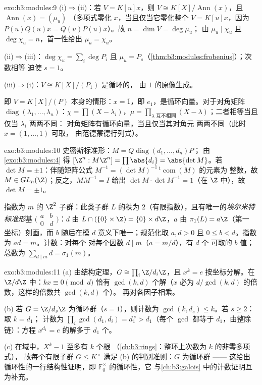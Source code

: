 \begin{solution}{exo:b3:modules:9}
(i)$\Rightarrow$(ii)：若 $V = K[u]x$，则 $V \cong
K[X]/\operatorname{Ann}(x)$，且 $\operatorname{Ann}(x) = (\mu_u)$
（多项式零化 $x$，当且仅当它零化整个 $V = K[u]x$，因为
$P(u)Q(u)x = Q(u)P(u)x$）。故 $n = \dim V = \deg \mu_u$；
由 $\mu_u \mid \chi_u$ 且 $\deg\chi_u = n$，首一性给出 $\mu_u =
\chi_u$。

(ii)$\Rightarrow$(iii)：$\deg\chi_u = \sum_i \deg P_i$ 且
$\mu_u = P_s$（\cref{thm:b3:modules:frobenius}）；次数相等
迫使 $s = 1$。

(iii)$\Rightarrow$(i)：$V \cong K[X]/(P_1)$ 是循环的，
由 $\bar 1$ 的原像生成。

即 $V = K[X]/(P)$ 本身的情形：$x = \bar
1$，即 $e_1$，是循环向量。对于对角矩阵
$\operatorname{diag}(\lambda_1, \dots, \lambda_n)$：$\chi = \prod
(X - \lambda_i)$，$\mu = \prod_{\lambda \text{ 互不相同}} (X -
\lambda)$；二者相等当且仅当 $\lambda_i$ 两两不同：
对角矩阵有循环向量，当且仅当其对角元
两两不同（此时 $x = (1, \dots, 1)$ 可取，
由范德蒙德行列式）。
\end{solution}

\begin{solution}{exo:b3:modules:10}
史密斯标准形：$M = Q\operatorname{diag}(d_1,\dots,d_n)P$；
由\cref{exo:b3:modules:4} 得 $[\Z^n : M\Z^n] = \prod\abs{d_i} =
\abs{\det M}$。若 $\det M = \pm 1$：伴随矩阵公式
$M^{-1} = (\det M)^{-1}\,{}^{t}\!\operatorname{com}(M)$ 的元素为
整数，故 $M \in GL_n(\Z)$；反之，$MM^{-1} = I$
给出 $\det M \cdot \det M^{-1} = 1$（在 $\Z$ 中），故 $\det M = \pm1$。

指数为 $m$ 的 $\Z^2$ 子群：此类子群 $L$ 的秩为
$2$（有限指数），且有唯一的\emph{埃尔米特
标准形}基 $\bigl(\begin{smallmatrix} a & b\\ 0 &
d\end{smallmatrix}\bigr)$：$d$ 由 $L \cap (\{0\}
\times \Z) = \{0\} \times d\Z$，$a$ 由 $\pi_1(L) = a\Z$（第一
坐标）刻画，而 $b$ 随后在模 $d$ 意义下唯一；规范化取 $a, d
> 0$ 且 $0 \leq b < d$。指数为 $ad = m$。计数：对每个
对每个因数 $d \mid m$（$a = m/d$），有 $d$ 个
可取的 $b$ 值；总数为 $\sum_{d \mid m} d = \sigma_1(m)$。
\end{solution}

\begin{solution}{exo:b3:modules:11}
(a) 由结构定理，$G \cong \prod_i\Z/d_i\Z$，且
$x^k = e$ 按坐标分解。在 $\Z/d\Z$ 中：$kx \equiv 0
\pmod d$ 恰有 $\gcd(k, d)$ 个解（$x$ 必为
$d/\gcd(k,d)$ 的倍数，这样的倍数共 $\gcd(k, d)$ 个）。
再对各因子相乘。

(b) 若 $G = \Z/d_s\Z$ 为循环群（$s = 1$），则计数为
$\gcd(k, d_s) \leq k$。若 $s \geq 2$：取 $k = d_1$；
计数为 $\prod_i\gcd(d_1, d_i) = d_1^{\,s} > d_1$（每个
$\gcd$ 都等于 $d_1$，由整除链）：方程
$x^{d_1} = e$ 的解多于 $d_1$ 个。

(c) 在域中，$X^k - 1$ 至多有 $k$ 个根
（\cref{ch:b3:rings}：整环上次数为 $k$ 的非零多项式），
故每个有限子群 $G \leq K^\times$
满足 (b) 的判别准则：$G$ 为循环群 —— 这给出
循环性的一行结构性证明，即
$\mathbb F_q^\times$ 的循环性，它
与\cref{ch:b3:galois} 中的计数证明互为补充。
\end{solution}

